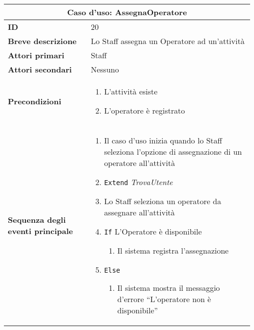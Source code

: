 \documentclass[a4paper]{report}
\begin{document}
\clearpage
\begin{table}[H]
\vspace*{-0cm}
\renewcommand{\arraystretch}{1.9}
\begin{tabular}{|p{3.9cm}|p{9.9cm}|}
\hline
\multicolumn{2}{|c|}{\textbf{Caso d’uso: AssegnaOperatore}} \\ \hline
	\textbf{ID} & 20 \\ \hline
	\textbf{Breve descrizione} & Lo Staff assegna un Operatore ad un’attività \\ \hline
	\textbf{Attori primari} & Staff \\ \hline
	\textbf{Attori secondari} & Nessuno \\ \hline
	\textbf{Precondizioni} & \begin{enumerate}[leftmargin=14pt,label=\arabic*.,labelsep=0.5em,topsep=0pt,partopsep=0pt,parsep=0pt,itemsep=0pt]
    \item L’attività esiste
    \item L’operatore è registrato
\end{enumerate} \\ \hline
	\textbf{Sequenza degli eventi principale} & \begin{enumerate}[leftmargin=14pt,label=\arabic*.,labelsep=0.5em,topsep=0pt,partopsep=0pt,parsep=0pt,itemsep=0pt]
    \item Il caso d'uso inizia quando lo Staff seleziona l'opzione di assegnazione di un operatore all'attività
    \item \texttt{Extend} \textit{TrovaUtente}
    \item Lo Staff seleziona un operatore da assegnare all'attività
    \item \texttt{If} L’Operatore è disponibile
    \begin{enumerate}[label=\arabic{enumi}.\arabic*.,leftmargin=22pt,labelsep=0.5em,topsep=0pt,partopsep=0pt,parsep=0pt,itemsep=0pt]
        \item Il sistema registra l’assegnazione
    \end{enumerate}
    \item \texttt{Else}
    \begin{enumerate}[label=\arabic{enumi}.\arabic*.,leftmargin=22pt,labelsep=0.5em,topsep=0pt,partopsep=0pt,parsep=0pt,itemsep=0pt]
        \item Il sistema mostra il messaggio d’errore “L’operatore non è disponibile”
    \end{enumerate}
\end{enumerate} \\ \hline

\end{tabular}
\end{table}
\end{document}

